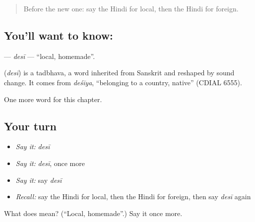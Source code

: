 \label{lesson:HI-C240-desi}



\begin{quote}
Before the new one: say the Hindi for local, then the Hindi for foreign.
\end{quote}

\subsection*{You'll want to know: }
\textbf{} — \emph{desī} — \textquotedblleft{}local, homemade\textquotedblright{}.

\begin{cousinweb}
\textbf{} (\emph{desī}) is a tadbhava, a word inherited from Sanskrit and reshaped by sound change. It comes from \emph{deśīya}, \textquotedblleft{}belonging to a country, native\textquotedblright{} (CDIAL 6555).
\end{cousinweb}

\begin{grammarlens}[title={What you've built}]
One more word for this chapter.
\end{grammarlens}

\subsection*{Your turn}
\begin{itemize}
\raggedright
  \item \emph{Say it:} \emph{desī}
  \item \emph{Say it:} \emph{desī}, once more
  \item \emph{Say it:} say \emph{desī}
  \item \emph{Recall:} say the Hindi for local, then the Hindi for foreign, then say \emph{desī} again
\end{itemize}

\begin{tcolorbox}[breakable,colback=teal!4,colframe=teal!35!black,title={Before you move on}]
What does  mean? (\textquotedblleft{}Local, homemade\textquotedblright{}.) Say it once more.
\end{tcolorbox}
